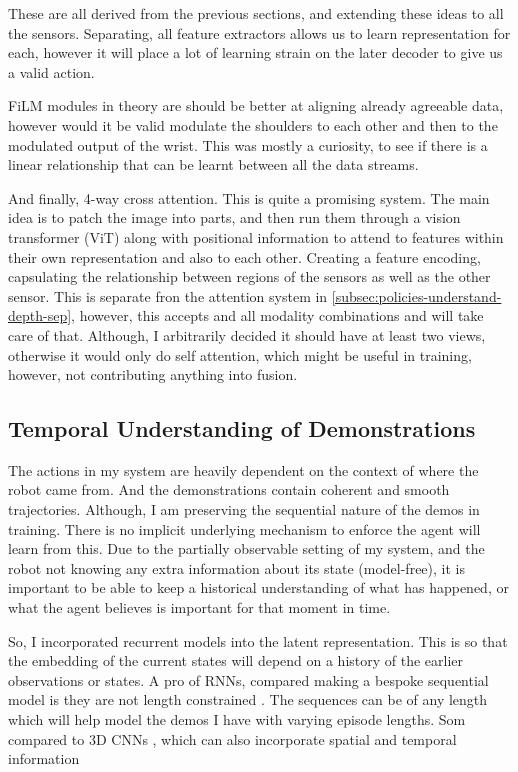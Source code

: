 These are all derived from the previous sections, and extending these ideas to all the sensors. Separating, all feature extractors allows us to learn representation for each, however it will place a lot of learning strain on the later decoder to give us a valid action. 

FiLM modules in theory are should be better at aligning already agreeable data, however would it be valid modulate the shoulders to each other and then to the modulated output of the wrist. This was mostly a curiosity, to see if there is a linear relationship that can be learnt between all the data streams.

And finally, 4-way cross attention. This is quite a promising system. The main idea is to patch the image into parts, and then run them through a vision transformer (ViT) along with positional information to attend to features within their own representation and also to each other. Creating a feature encoding, capsulating the relationship between regions of the sensors as well as the other sensor.  This is separate fron the attention system in \ref{subsec:policies-understand-depth-sep}, however, this accepts and all modality combinations and will take care of that. Although, I arbitrarily decided it should have at least two views, otherwise it would only do self attention, which might be useful in training, however, not contributing anything into fusion.

\subsection{Temporal Understanding of Demonstrations}
The actions in my system are heavily dependent on the context of where the robot came from. And the demonstrations contain coherent and smooth trajectories. Although, I am preserving the sequential nature of the demos in training. There is no implicit underlying mechanism to enforce the agent will learn from this. Due to the partially observable setting of my system, and the robot not knowing any extra information about its state (model-free), it is important to be able to keep a historical understanding of what has happened, or what the agent believes is important for that moment in time.

So, I incorporated recurrent models into the latent representation. This is so that the embedding of the current states will depend on a history of the earlier observations or states.
A pro of RNNs, compared making a bespoke sequential model is they are not length constrained . The sequences can be of any length which will help model the demos I have with varying episode lengths. Som compared to 3D CNNs , which can also incorporate spatial and temporal information 


